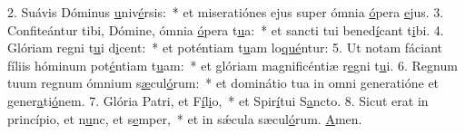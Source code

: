 2. Suávis Dóminus \uline{u}niv\uline{é}rsis:~* et miseratiónes ejus super ómnia \uline{ó}pera \uline{e}jus.
3. Confiteántur tibi, Dómine, ómnia \uline{ó}pera t\uline{u}a:~* et sancti tui bened\uline{í}cant t\uline{i}bi.
4. Glóriam regni t\uline{u}i d\uline{i}cent:~* et poténtiam t\uline{u}am lo\uline{qué}ntur:
5. Ut notam fáciant fíliis hóminum pot\uline{é}ntiam t\uline{u}am:~* et glóriam magnificéntiæ r\uline{e}gni t\uline{u}i.
6. Regnum tuum regnum ómnium s\uline{æ}cul\uline{ó}rum:~* et dominátio tua in omni generatióne et gener\uline{a}ti\uline{ó}nem.
7. Glória Patri, et F\uline{í}l\uline{i}o,~* et Spir\uline{í}tui S\uline{a}ncto.
8. Sicut erat in princípio, et n\uline{u}nc, et s\uline{e}mper,~* et in sǽcula sæcul\uline{ó}rum. \uline{A}men.

